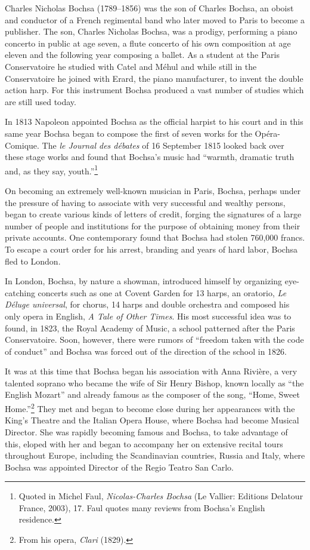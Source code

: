 \documentclass[a4paper, oneside, 12pt]{memoir}
\begin{document}
Charles Nicholas Bochsa (1789--1856) was the son of Charles Bochsa, an oboist and conductor of a French regimental band who later moved to Paris to become a publisher. The son, Charles Nicholas Bochsa, was a prodigy, performing a piano concerto in public at age seven, a flute concerto of his own composition at age eleven and the following year composing a ballet. As a student at the Paris Conservatoire he studied with Catel and M\'{e}hul and while still in the Conservatoire  he joined with Erard, the piano manufacturer, to invent the double action harp. For this instrument Bochsa produced a vast number of studies which are still used today.

In 1813 Napoleon appointed Bochsa as the official harpist to his court and in this same year Bochsa began to compose the first of seven works for the Op\'{e}ra-Comique. The \textit{le Journal des d\'{e}bates} of 16 September 1815 looked back over these stage works and found that Bochsa's music had ``warmth, dramatic truth and, as they say, youth.''\footnote{Quoted in Michel Faul, \textit{Nicolas-Charles Bochsa} (Le Vallier: Editions Delatour France, 2003), 17. Faul quotes many reviews from Bochsa's English residence.}

On becoming an extremely well-known musician in Paris, Bochsa, perhaps under the pressure of having to associate with very successful and wealthy persons, began to create various kinds of letters of credit, forging the signatures of a large number of people and institutions for the purpose of obtaining money from their private accounts. One contemporary found that Bochsa had stolen 760,000 francs. To escape a court order for his arrest, branding and years of hard labor, Bochsa fled to London.

In London, Bochsa, by nature a showman, introduced himself by organizing eye-catching concerts such as one at Covent Garden for 13 harps, an oratorio, \textit{Le Déluge universal}, for chorus, 14 harps and double orchestra and composed his only opera in English, \textit{A Tale of Other Times}. His most successful idea was to found, in 1823, the Royal Academy of Music, a school patterned after the Paris Conservatoire.  Soon, however, there were rumors of ``freedom taken with the code of conduct'' and Bochsa was forced out of the direction of the school in 1826.  

It was at this time that Bochsa began his association with Anna Rivi\`{e}re, a very talented soprano who became the wife of Sir Henry Bishop, known locally as ``the English Mozart'' and already famous as the composer of the song, ``Home, Sweet Home.''\footnote{From his opera, \textit{Clari} (1829).} They met and began to become close during her appearances with the King's Theatre and the Italian Opera House, where Bochsa had become Musical Director. She was rapidly becoming famous and Bochsa, to take advantage of this, eloped with her and began to accompany her on extensive recital tours throughout Europe, including the Scandinavian countries, Russia and Italy, where Bochsa was appointed Director of the Regio Teatro San Carlo.  
\end{document}
